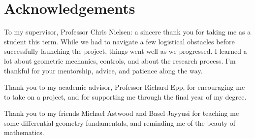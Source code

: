 \documentclass[main.tex]{subfiles}
\begin{document}
\chapter*{Acknowledgements}
To my supervisor, Professor Chris Nielsen: a sincere thank you for taking me as a student this term. While we had to navigate a few logistical obstacles before successfully launching the project, things went well as we progressed. I learned a lot about geometric mechanics, controls, and about the research process. I'm thankful for your mentorship, advice, and patience along the way.

Thank you to my academic advisor, Professor Richard Epp, for encouraging me to take on a project, and for supporting me through the final year of my degree. 

Thank you to my friends Michael Astwood and Basel Jayyusi for teaching me some differential geometry fundamentals, and reminding me of the beauty of mathematics.
\end{document}
